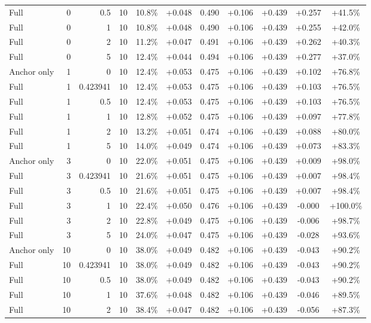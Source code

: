 \begin{table}[htbp]
\begin{tabular}{lrrrccccccc}
Full & 0 & 0.5 & 10 & 10.8\% & +0.048 & 0.490 & +0.106 & +0.439 & +0.257 & +41.5\% \\
Full & 0 & 1 & 10 & 10.8\% & +0.048 & 0.490 & +0.106 & +0.439 & +0.255 & +42.0\% \\
Full & 0 & 2 & 10 & 11.2\% & +0.047 & 0.491 & +0.106 & +0.439 & +0.262 & +40.3\% \\
Full & 0 & 5 & 10 & 12.4\% & +0.044 & 0.494 & +0.106 & +0.439 & +0.277 & +37.0\% \\
Anchor only & 1 & 0 & 10 & 12.4\% & +0.053 & 0.475 & +0.106 & +0.439 & +0.102 & +76.8\% \\
Full & 1 & 0.423941 & 10 & 12.4\% & +0.053 & 0.475 & +0.106 & +0.439 & +0.103 & +76.5\% \\
Full & 1 & 0.5 & 10 & 12.4\% & +0.053 & 0.475 & +0.106 & +0.439 & +0.103 & +76.5\% \\
Full & 1 & 1 & 10 & 12.8\% & +0.052 & 0.475 & +0.106 & +0.439 & +0.097 & +77.8\% \\
Full & 1 & 2 & 10 & 13.2\% & +0.051 & 0.474 & +0.106 & +0.439 & +0.088 & +80.0\% \\
Full & 1 & 5 & 10 & 14.0\% & +0.049 & 0.474 & +0.106 & +0.439 & +0.073 & +83.3\% \\
Anchor only & 3 & 0 & 10 & 22.0\% & +0.051 & 0.475 & +0.106 & +0.439 & +0.009 & +98.0\% \\
Full & 3 & 0.423941 & 10 & 21.6\% & +0.051 & 0.475 & +0.106 & +0.439 & +0.007 & +98.4\% \\
Full & 3 & 0.5 & 10 & 21.6\% & +0.051 & 0.475 & +0.106 & +0.439 & +0.007 & +98.4\% \\
Full & 3 & 1 & 10 & 22.4\% & +0.050 & 0.476 & +0.106 & +0.439 & -0.000 & +100.0\% \\
Full & 3 & 2 & 10 & 22.8\% & +0.049 & 0.475 & +0.106 & +0.439 & -0.006 & +98.7\% \\
Full & 3 & 5 & 10 & 24.0\% & +0.047 & 0.475 & +0.106 & +0.439 & -0.028 & +93.6\% \\
Anchor only & 10 & 0 & 10 & 38.0\% & +0.049 & 0.482 & +0.106 & +0.439 & -0.043 & +90.2\% \\
Full & 10 & 0.423941 & 10 & 38.0\% & +0.049 & 0.482 & +0.106 & +0.439 & -0.043 & +90.2\% \\
Full & 10 & 0.5 & 10 & 38.0\% & +0.049 & 0.482 & +0.106 & +0.439 & -0.043 & +90.2\% \\
Full & 10 & 1 & 10 & 37.6\% & +0.048 & 0.482 & +0.106 & +0.439 & -0.046 & +89.5\% \\
Full & 10 & 2 & 10 & 38.4\% & +0.047 & 0.482 & +0.106 & +0.439 & -0.056 & +87.3\% \\

\end{tabular}
\end{table}
